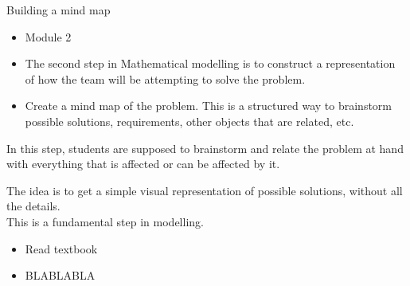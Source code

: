 \standardonlynewpage


%
%



\begin{module}{Building a mind map}
	\label{mindmap}

	
	
\end{module}



\begin{lesson}


	\begin{itemize}
		\item Module 2
	\end{itemize}

	\begin{itemize}

		\item The second step in Mathematical modelling is to construct a representation of how the team will be attempting to solve the problem.

		\item Create a mind map of the problem. This is a structured way to brainstorm possible solutions, requirements, other objects that are related, etc.
	\end{itemize}
	

In this step, students are supposed to brainstorm and relate the problem at hand with everything that is affected or can be affected by it.

The idea is to get a simple visual representation of possible solutions, without all the details. \\

This is a fundamental step in modelling.


\begin{itemize}
	\item Read textbook
\end{itemize}


\begin{itemize}
	\item BLABLABLA
\end{itemize}


\end{lesson}
